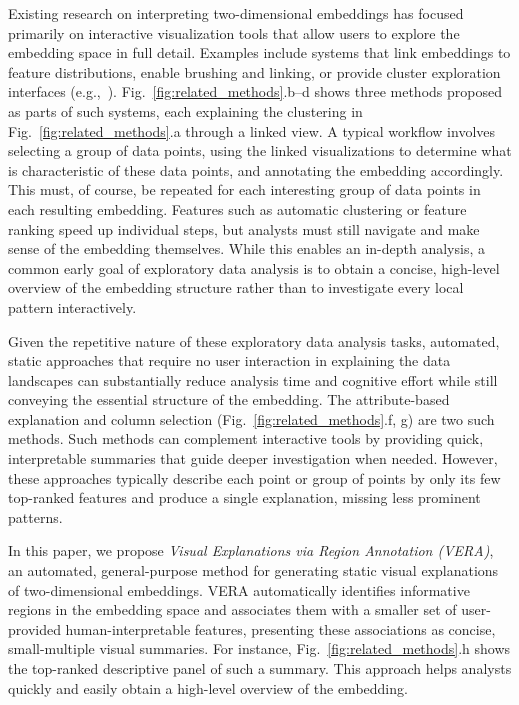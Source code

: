 \documentclass[lettersize,journal]{IEEEtran}
\begin{document}
Existing research on interpreting two-dimensional embeddings has focused primarily on interactive visualization tools that allow users to explore the embedding space in full detail. Examples include systems that link embeddings to feature distributions, enable brushing and linking, or provide cluster exploration interfaces (e.g.,~\cite{Endert2014,Krause2014}).
Fig.~\ref{fig:related_methods}.b--d shows three methods proposed as parts of such systems, each explaining the clustering in Fig.~\ref{fig:related_methods}.a through a linked view.
A typical workflow involves selecting a group of data points, using the linked visualizations to determine what is characteristic of these data points, and annotating the embedding accordingly.
This must, of course, be repeated for each interesting group of data points in each resulting embedding.
Features such as automatic clustering or feature ranking speed up individual steps, but analysts must still navigate and make sense of the embedding themselves.
While this enables an in-depth analysis, a common early goal of exploratory data analysis is to obtain a concise, high-level overview of the embedding structure rather than to investigate every local pattern interactively.

Given the repetitive nature of these exploratory data analysis tasks, automated, static approaches that require no user interaction in explaining the data landscapes can substantially reduce analysis time and cognitive effort while still conveying the essential structure of the embedding.
The attribute-based explanation and column selection (Fig.~\ref{fig:related_methods}.f, g) are two such methods.
Such methods can complement interactive tools by providing quick, interpretable summaries that guide deeper investigation when needed.
However, these approaches typically describe each point or group of points by only its few top-ranked features and produce a single explanation, missing less prominent patterns.

In this paper, we propose \textit{Visual Explanations via Region Annotation (VERA)}, an automated, general-purpose method for generating static visual explanations of two-dimensional embeddings. VERA automatically identifies informative regions in the embedding space and associates them with a smaller set of user-provided human-interpretable features, presenting these associations as concise, small-multiple visual summaries.
For instance, Fig.~\ref{fig:related_methods}.h shows the top-ranked descriptive panel of such a summary.
This approach helps analysts quickly and easily obtain a high-level overview of the embedding.
\end{document}
